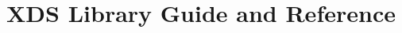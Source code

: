 \commontrue

\FrameIsDeepfalse

\makeindex

\newcommand{\BookName}{Library Guide and Reference}
\ifonline\title{XDS Library Guide and Reference}\fi

\newcommand{\extlib}
{
\begin{center}
\footnotesize
WARNING:

Language extensions are used in the interface of this module. \\
All your modules importing this one may be non-portable to other compilers.
\end{center}
}


